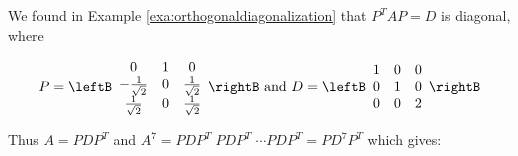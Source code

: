 \begin{solution}
We found in Example \ref{exa:orthogonaldiagonalization} that $P^TAP=D$ is diagonal, where 

\begin{equation*}
P= \leftB 
\begin{array}{ccc}
0 & 1 & 0 \\ 
-\frac{1}{\sqrt{2}} & 0 & \frac{1}{\sqrt{2}} \\ 
\frac{1}{\sqrt{2}} & 0 & \frac{1}{\sqrt{2}}
\end{array}
\rightB \text{ and } 
D = \leftB 
\begin{array}{ccc}
1 & 0 & 0 \\ 
0 & 1 & 0 \\ 
0 & 0 & 2
\end{array}
\rightB
\end{equation*}

Thus $A=PDP^T$ and $A^7=PDP^T \; PDP^T \; \cdots PDP^T = PD^7P^T$ which gives:


\end{solution}
